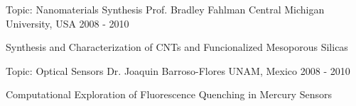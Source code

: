 \begin{cventries}

  \cventry
    {Topic: Nanomaterials Synthesis} %
    {Prof. Bradley Fahlman} %
    {Central Michigan University, USA} %
    {2008 - 2010}
    {
      \begin{cvitems} %
        \item {Synthesis and Characterization of CNTs and Funcionalized Mesoporous Silicas}
      \end{cvitems}
    }

  \cventry
    {Topic: Optical Sensors} %
    {Dr. Joaquin Barroso-Flores} %
    {UNAM, Mexico} %
    {2008 - 2010} %
    {
      \begin{cvitems} %
        \item {Computational Exploration of Fluorescence Quenching in Mercury Sensors}
      \end{cvitems}
    }

\end{cventries}
